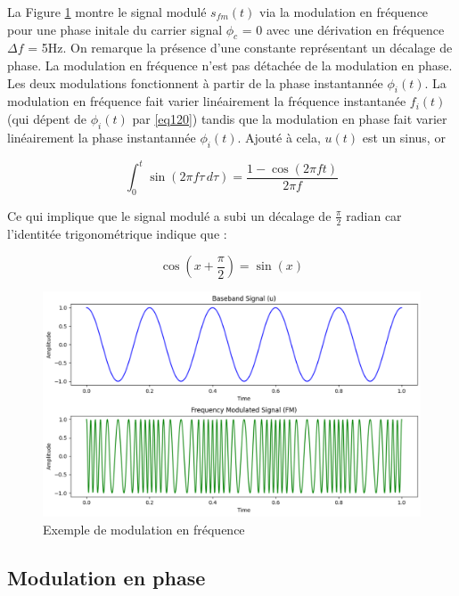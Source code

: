 \vspace{0.1cm}

La Figure \ref{term2} montre le signal modulé $s_{fm}(t)$ via la modulation en fréquence pour une phase initale du carrier signal $\phi_{c}$ = 0 avec une dérivation en fréquence $\Delta f$ = 5Hz. On remarque la présence d'une constante représentant un décalage de phase. La modulation en fréquence n'est pas détachée de la modulation en phase. Les deux modulations fonctionnent à partir de la phase instantannée $\phi_i(t)$. La modulation en fréquence fait varier linéairement la fréquence instantanée $f_i(t)$ (qui dépent de $\phi_i(t)$ par \ref{eq120}) tandis que la modulation en phase fait varier linéairement la phase instantannée $\phi_i(t)$. Ajouté à cela, $u(t)$ est un sinus, or 

\begin{equation}\label{eq122}
\int_{0}^{t} \sin(2 \pi f \tau \, d\tau) = \frac{1 - \cos(2\pi f t)}{2 \pi f}
\end{equation}

Ce qui implique que le signal modulé a subi un décalage de $\frac{\pi}{2}$ radian car l'identitée trigonométrique indique que :

\begin{equation}\label{eq122}
\cos(x+\frac{\pi}{2}) = \sin(x)
\end{equation}

\begin{figure}[h]
\centering

\includegraphics[scale=0.5]{images/FM_mod.PNG}
\caption{Exemple de modulation en fréquence}\label{term2}
\end{figure}

\subsection{Modulation en phase}

